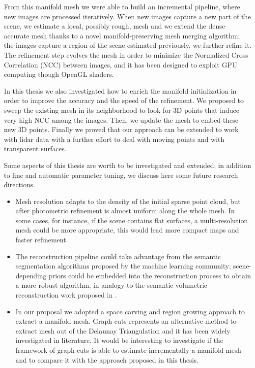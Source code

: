 From this manifold mesh we were able to build an incremental pipeline, where new images are processed iteratively.
When new images  capture a new part of the scene, we estimate a local, possibly rough, mesh and we extend the dense accurate mesh thanks to a novel manifold-preserving mesh merging algorithm; the images capture a region of the scene estimated previously, we further refine it.
The refinement step evolves the mesh in order to minimize the Normalized Cross Correlation (NCC) between images, and it has been designed to exploit GPU computing though OpenGL shaders.

In this thesis we also investigated how to enrich the manifold initialization in order to improve the accuracy and the speed of the refinement. 
We proposed to sweep the existing mesh in its neighborhood to look for 3D points that induce very high NCC among the images. Then, we  update the mesh to embed these new 3D points.
Finally we proved that our approach can be extended to work with lidar data with a further effort to deal with moving points and with transparent surfaces.

Some aspects of this thesis are worth to be investigated and extended; in addition to fine and automatic parameter tuning, we discuss here some future research directions.
\begin{itemize}
 \item Mesh resolution adapts to the density of the initial sparse point cloud, but after photometric refinement is almost uniform along the whole mesh. In some cases, for instance, if the scene contains flat surfaces, a multi-resolution mesh could be more appropriate, this would lead more compact maps and faster refinement.
 \item The reconstruction pipeline could take advantage from the semantic segmentation algorithms proposed by the machine learning community; scene-depending priors could be embedded into the reconstruction process to obtain a more robust algorithm, in analogy to the semantic volumetric reconstruction work proposed in  \cite{savinov2016semantic,HaZa16}.
 \item In our proposal we adopted a space carving and region growing approach to extract a manifold mesh. Graph cuts represents an alternative method to extract mesh out of the Delaunay Triangulation and it has been widely investigated in literature. It would be interesting to investigate if the framework of graph cuts is able to estimate incrementally a manifold mesh and to compare it with the approach proposed in this thesis.
\end{itemize}




















